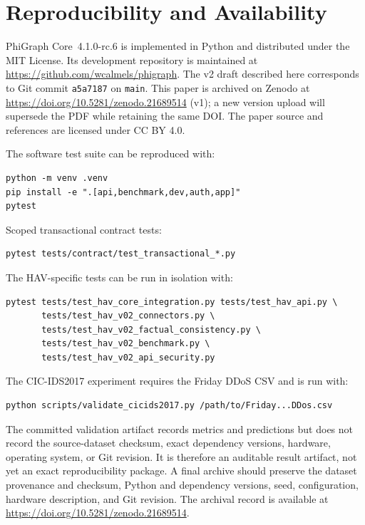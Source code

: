 \documentclass[11pt]{article}
\begin{document}
\section{Reproducibility and Availability}

PhiGraph Core~4.1.0-rc.6 is implemented in Python and distributed under the MIT
License. Its development repository is maintained at
\url{https://github.com/wcalmels/phigraph}. The v2 draft described here
corresponds to Git commit \texttt{a5a7187} on \texttt{main}. This paper is
archived on Zenodo at
\url{https://doi.org/10.5281/zenodo.21689514} (v1); a new version upload will
supersede the PDF while retaining the same DOI. The paper source and references
are licensed under CC BY 4.0.

The software test suite can be reproduced with:

\begin{verbatim}
python -m venv .venv
pip install -e ".[api,benchmark,dev,auth,app]"
pytest
\end{verbatim}

Scoped transactional contract tests:

\begin{verbatim}
pytest tests/contract/test_transactional_*.py
\end{verbatim}

The HAV-specific tests can be run in isolation with:

\begin{verbatim}
pytest tests/test_hav_core_integration.py tests/test_hav_api.py \
       tests/test_hav_v02_connectors.py \
       tests/test_hav_v02_factual_consistency.py \
       tests/test_hav_v02_benchmark.py \
       tests/test_hav_v02_api_security.py
\end{verbatim}

The CIC-IDS2017 experiment requires the Friday DDoS CSV and is run with:

\begin{verbatim}
python scripts/validate_cicids2017.py /path/to/Friday...DDos.csv
\end{verbatim}

The committed validation artifact records metrics and predictions but does not
record the source-dataset checksum, exact dependency versions, hardware,
operating system, or Git revision. It is therefore an auditable result artifact,
not yet an exact reproducibility package. A final archive should preserve the
dataset provenance and checksum, Python and dependency versions, seed,
configuration, hardware description, and Git revision.
The archival record is available at \url{https://doi.org/10.5281/zenodo.21689514}.
\end{document}
